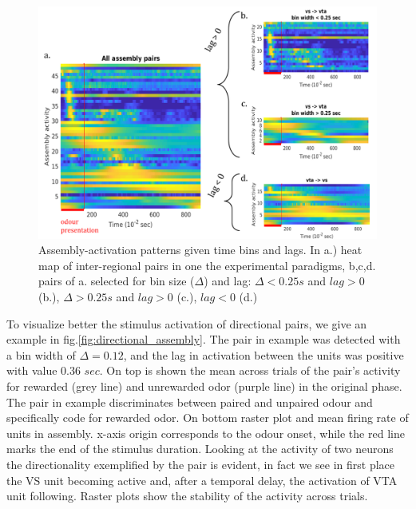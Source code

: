 \begin{figure}
    \centering
    \includegraphics[scale=0.45]{figures/AsActPerBinLag1.png}
    \caption{Assembly-activation patterns given time bins and lags. In a.) heat map of inter-regional pairs in one the experimental paradigms, b,c,d. pairs of a. selected for bin size ($\Delta$) and lag: $\Delta < 0.25 s$ and $lag > 0$ (b.), $\Delta > 0.25 s$ and $lag > 0$ (c.), $lag < 0$ (d.)}
    \label{fig:AsActBinLag}
\end{figure}
To visualize better the stimulus activation of directional pairs, we give an example in fig.\ref{fig:directional_assembly}. The pair in example was detected with a bin width of $\Delta = 0.12$, and the lag in activation between the units was positive with value 0.36 $sec$. On top is shown the mean across trials of the pair's activity for rewarded (grey line) and unrewarded odor (purple line) in the original phase. The pair in example discriminates between paired and unpaired odour and specifically code for rewarded odor. On bottom raster plot and mean firing rate of units in assembly. x-axis origin corresponds to the odour onset, while the red line marks the end of the stimulus duration.
Looking at the activity of two neurons the directionality exemplified by the pair is evident, in fact we see in first place the VS unit becoming active and, after a temporal delay, the activation of VTA unit following. Raster plots show the stability of the activity across trials.  
